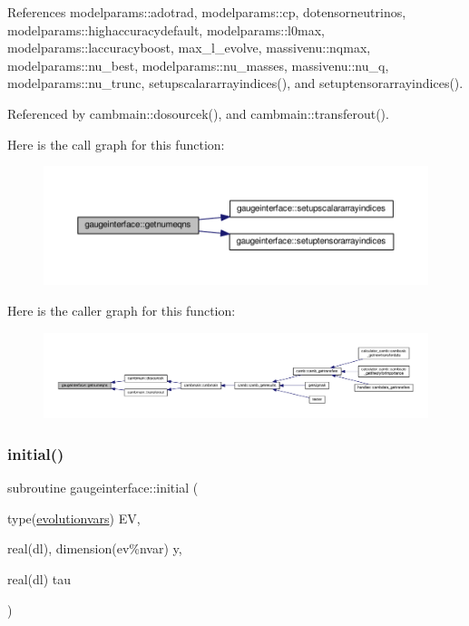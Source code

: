 References modelparams\+::adotrad, modelparams\+::cp, dotensorneutrinos, modelparams\+::highaccuracydefault, modelparams\+::l0max, modelparams\+::laccuracyboost, max\+\_\+l\+\_\+evolve, massivenu\+::nqmax, modelparams\+::nu\+\_\+best, modelparams\+::nu\+\_\+masses, massivenu\+::nu\+\_\+q, modelparams\+::nu\+\_\+trunc, setupscalararrayindices(), and setuptensorarrayindices().



Referenced by cambmain\+::dosourcek(), and cambmain\+::transferout().

Here is the call graph for this function\+:
\nopagebreak
\begin{figure}[H]
\begin{center}
\leavevmode
\includegraphics[width=350pt]{namespacegaugeinterface_ad273d68dadb4d4fcc10422fed213ca25_cgraph}
\end{center}
\end{figure}
Here is the caller graph for this function\+:
\nopagebreak
\begin{figure}[H]
\begin{center}
\leavevmode
\includegraphics[width=350pt]{namespacegaugeinterface_ad273d68dadb4d4fcc10422fed213ca25_icgraph}
\end{center}
\end{figure}
\mbox{\label{namespacegaugeinterface_aa05aaad2bec1907778ea8eae3a7ba521}} 
\subsubsection{\texorpdfstring{initial()}{initial()}}
{\footnotesize\ttfamily subroutine gaugeinterface\+::initial (\begin{DoxyParamCaption}\item[{type(\mbox{\hyperlink{structgaugeinterface_1_1evolutionvars}{evolutionvars}})}]{EV,  }\item[{real(dl), dimension(ev\%nvar)}]{y,  }\item[{real(dl)}]{tau }\end{DoxyParamCaption})}



